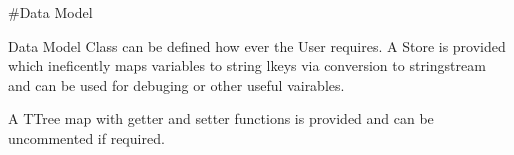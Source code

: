 \#\+Data Model 


Data Model Class can be defined how ever the User requires. A Store is provided which ineficently maps variables to string lkeys via conversion to stringstream and can be used for debuging or other useful vairables.

A TTree map with getter and setter functions is provided and can be uncommented if required. 